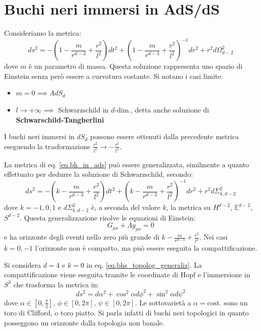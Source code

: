 \section{Buchi neri immersi in AdS/dS}
Consideriamo la metrica:
\begin{equation}
    ds^2 = - \left( 1 - \frac{m}{r^{d-3}} + \frac{r^2}{l^2} \right)dt^2 + \left( 1 - \frac{m}{r^{d-3}} + \frac{r^2}{l^2} \right)^{-1}dr^2 + r^2d\Omega_{d-2}^2
    \label{eq.bh_in_ads}
\end{equation}
dove $m$ è un parametro di massa. Questa soluzione rappresenta uno spazio di Einstein senza però essere a curvatura costante. Si notano i casi limite:
\begin{itemize}
    \item $m=0 \implies AdS_d$
    \item $l\rightarrow + \infty \implies $ Schwarzschild in $d$-dim., detta  anche soluzione di \textbf{Schwarschild-Tangherlini}
\end{itemize}
I buchi neri immersi in $dS_d$ possono essere ottenuti dalla precedente metrica eseguendo la trasformazione $\frac{r^2}{l^2}\rightarrow - \frac{r^2}{l^2}$.

La metrica di eq. \ref{eq.bh_in_ads} può essere generalizzata, similmente a quanto effettuato per dedurre la soluzione di Schwarzschild, secondo:
\begin{equation}
    ds^2 = -\left( k - \frac{m}{r^{d-3}} + \frac{r^2}{l^2}  \right)dt^2 + \left( k - \frac{m}{r^{d-3}} + \frac{r^2}{l^2} \right)^{-1}dr^2 + r^2d\Sigma_{k, d-2}^2
    \label{eq.bhs_topolog_generaliz}
\end{equation}
dove $k = -1,0,1$ e $d\Sigma_{k,d-2}^2$ è, a seconda del valore $k$, la metrica su $H^{d-2}$, $\mathbb{E}^{d-2}, $$S^{d-2}$.
Questa generalizzazione risolve le equazioni di Einstein:
\begin{equation*}
    G_{\mu\nu} + \Lambda g_{\mu\nu} = 0
\end{equation*}
e ha orizzonte degli eventi nello zero più grande di $ k- \frac{m}{r^{d-3}} + \frac{r^2}{l^2} $. Nei casi $k=0, -1$ l'orizzonte non è compatto, ma può essere eseguita la compattificazione.
\begin{esempio}
Si considera $d = 4$ e $k=0$ in eq. \ref{eq.bhs_topolog_generaliz}. La compattificazione  viene eseguita tramite le coordinate di Hopf e l'immersione in $S^3$ che trasforma la metrica in:
\begin{equation*}
    ds^2 = d\alpha^2 + \cos^2\alpha d\phi^2 + \sin^2 \alpha d\psi^2
\end{equation*}
dove $\alpha \in [0,\frac{\pi}{2}]$, $ \phi \in [0,2\pi]$, $\psi \in [0, 2\pi]$.  Le sottovarietà a $\alpha = \textrm{cost.}$ sono un toro di Clifford, o toro piatto. Si parla infatti di buchi neri topologici in quanto posseggono un orizzonte dalla topologia non banale.
\end{esempio}